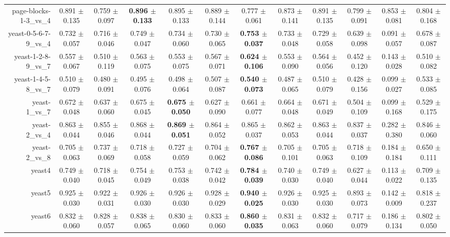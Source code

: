 \begin{table}[!ht]
{\begin{tabular}{r c c c c c c c c c c c}
page-blocks-1-3\_vs\_4 & 0.891 $\pm$ 0.135 & 0.759 $\pm$ 0.097 & \textbf{0.896 $\pm$ 0.133} & 0.895 $\pm$ 0.133 & 0.889 $\pm$ 0.144 & 0.777 $\pm$ 0.061 & 0.873 $\pm$ 0.141 & 0.891 $\pm$ 0.135 & 0.799 $\pm$ 0.091 & 0.853 $\pm$ 0.081 & 0.804 $\pm$ 0.168 \\
yeast-0-5-6-7-9\_vs\_4 & 0.732 $\pm$ 0.057 & 0.716 $\pm$ 0.046 & 0.749 $\pm$ 0.047 & 0.734 $\pm$ 0.060 & 0.730 $\pm$ 0.065 & \textbf{0.753 $\pm$ 0.037} & 0.733 $\pm$ 0.048 & 0.729 $\pm$ 0.058 & 0.639 $\pm$ 0.098 & 0.091 $\pm$ 0.057 & 0.678 $\pm$ 0.087 \\
yeast-1-2-8-9\_vs\_7 & 0.557 $\pm$ 0.067 & 0.510 $\pm$ 0.119 & 0.563 $\pm$ 0.075 & 0.553 $\pm$ 0.075 & 0.567 $\pm$ 0.071 & \textbf{0.624 $\pm$ 0.106} & 0.553 $\pm$ 0.090 & 0.564 $\pm$ 0.056 & 0.452 $\pm$ 0.120 & 0.143 $\pm$ 0.028 & 0.510 $\pm$ 0.082 \\
yeast-1-4-5-8\_vs\_7 & 0.510 $\pm$ 0.079 & 0.480 $\pm$ 0.091 & 0.495 $\pm$ 0.076 & 0.498 $\pm$ 0.064 & 0.507 $\pm$ 0.087 & \textbf{0.540 $\pm$ 0.073} & 0.487 $\pm$ 0.065 & 0.510 $\pm$ 0.079 & 0.428 $\pm$ 0.156 & 0.099 $\pm$ 0.027 & 0.533 $\pm$ 0.085 \\
yeast-1\_vs\_7 & 0.672 $\pm$ 0.048 & 0.637 $\pm$ 0.060 & 0.675 $\pm$ 0.045 & \textbf{0.675 $\pm$ 0.050} & 0.627 $\pm$ 0.090 & 0.661 $\pm$ 0.077 & 0.664 $\pm$ 0.048 & 0.671 $\pm$ 0.049 & 0.504 $\pm$ 0.109 & 0.099 $\pm$ 0.168 & 0.529 $\pm$ 0.175 \\
yeast-2\_vs\_4 & 0.863 $\pm$ 0.044 & 0.855 $\pm$ 0.046 & 0.868 $\pm$ 0.044 & \textbf{0.869 $\pm$ 0.051} & 0.864 $\pm$ 0.052 & 0.865 $\pm$ 0.037 & 0.862 $\pm$ 0.053 & 0.863 $\pm$ 0.044 & 0.837 $\pm$ 0.037 & 0.282 $\pm$ 0.380 & 0.846 $\pm$ 0.060 \\
yeast-2\_vs\_8 & 0.705 $\pm$ 0.063 & 0.737 $\pm$ 0.069 & 0.718 $\pm$ 0.058 & 0.727 $\pm$ 0.059 & 0.704 $\pm$ 0.062 & \textbf{0.767 $\pm$ 0.086} & 0.705 $\pm$ 0.101 & 0.705 $\pm$ 0.063 & 0.718 $\pm$ 0.109 & 0.184 $\pm$ 0.184 & 0.650 $\pm$ 0.111 \\
yeast4 & 0.749 $\pm$ 0.040 & 0.718 $\pm$ 0.045 & 0.754 $\pm$ 0.049 & 0.753 $\pm$ 0.038 & 0.742 $\pm$ 0.042 & \textbf{0.784 $\pm$ 0.039} & 0.740 $\pm$ 0.030 & 0.749 $\pm$ 0.040 & 0.627 $\pm$ 0.044 & 0.113 $\pm$ 0.022 & 0.709 $\pm$ 0.135 \\
yeast5 & 0.925 $\pm$ 0.030 & 0.922 $\pm$ 0.031 & 0.926 $\pm$ 0.030 & 0.926 $\pm$ 0.030 & 0.928 $\pm$ 0.029 & \textbf{0.940 $\pm$ 0.025} & 0.926 $\pm$ 0.030 & 0.925 $\pm$ 0.030 & 0.893 $\pm$ 0.073 & 0.142 $\pm$ 0.009 & 0.818 $\pm$ 0.237 \\
yeast6 & 0.832 $\pm$ 0.060 & 0.828 $\pm$ 0.057 & 0.838 $\pm$ 0.065 & 0.830 $\pm$ 0.060 & 0.833 $\pm$ 0.060 & \textbf{0.860 $\pm$ 0.035} & 0.831 $\pm$ 0.063 & 0.832 $\pm$ 0.060 & 0.717 $\pm$ 0.079 & 0.186 $\pm$ 0.134 & 0.802 $\pm$ 0.050 \\

\end{tabular}}
\end{table}
